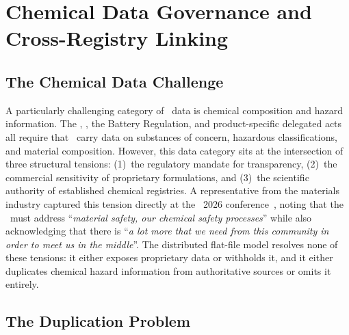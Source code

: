 \section{Chemical Data Governance and Cross-Registry Linking}

\subsection{The Chemical Data Challenge}

A particularly challenging category of \DPP\ data is chemical composition and
hazard information. The \ESPR, \REACH, the Battery Regulation, and
product-specific delegated acts all require that \DPPs\ carry data on substances
of concern, hazardous classifications, and material composition. However, this
data category sits at the intersection of three structural tensions: (1)~the
regulatory mandate for transparency, (2)~the commercial sensitivity of
proprietary formulations, and (3)~the scientific authority of established
chemical registries. A representative from the materials industry captured this
tension directly at the \DPPforEU~2026 conference~\cite{dpp4eu2026_day2}, noting
that the \DPP\ must address ``\textit{material safety, our chemical safety
processes}'' while also acknowledging that there is ``\textit{a lot more that we
need from this community in order to meet us in the middle}''. The distributed
flat-file model resolves none of these tensions: it either exposes proprietary
data or withholds it, and it either duplicates chemical hazard information from
authoritative sources or omits it entirely.

\subsection{The Duplication Problem}

